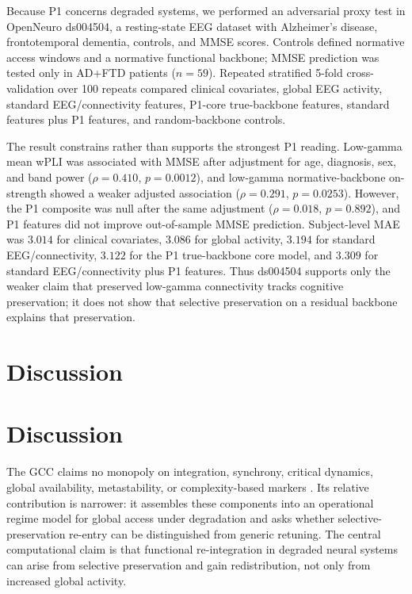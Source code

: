 \documentclass[11pt,a4paper]{article}
\theoremstyle{plain}
\theoremstyle{definition}
\theoremstyle{remark}
\begin{document}
Because P1 concerns degraded systems, we performed an adversarial proxy test in OpenNeuro ds004504, a resting-state EEG dataset with Alzheimer's disease, frontotemporal dementia, controls, and MMSE scores. Controls defined normative access windows and a normative functional backbone; MMSE prediction was tested only in AD+FTD patients ($n=59$). Repeated stratified 5-fold cross-validation over 100 repeats compared clinical covariates, global EEG activity, standard EEG/connectivity features, P1-core true-backbone features, standard features plus P1 features, and random-backbone controls.

The result constrains rather than supports the strongest P1 reading. Low-gamma mean wPLI was associated with MMSE after adjustment for age, diagnosis, sex, and band power ($\rho = 0.410$, $p = 0.0012$), and low-gamma normative-backbone on-strength showed a weaker adjusted association ($\rho = 0.291$, $p = 0.0253$). However, the P1 composite was null after the same adjustment ($\rho = 0.018$, $p = 0.892$), and P1 features did not improve out-of-sample MMSE prediction. Subject-level MAE was $3.014$ for clinical covariates, $3.086$ for global activity, $3.194$ for standard EEG/connectivity, $3.122$ for the P1 true-backbone core model, and $3.309$ for standard EEG/connectivity plus P1 features. Thus ds004504 supports only the weaker claim that preserved low-gamma connectivity tracks cognitive preservation; it does not show that selective preservation on a residual backbone explains that preservation.


\section*{Discussion}

\section{Discussion}
\label{sec:diskussion}

The GCC claims no monopoly on integration, synchrony, critical dynamics, global availability, metastability, or complexity-based markers \citep{dehaene1998,tononi2004,fries2015,kelso2012,deco2017,casali2013,demertzi2019,carhartharris2014,schartner2015,luppi2019}. Its relative contribution is narrower: it assembles these components into an operational regime model for global access under degradation and asks whether selective-preservation re-entry can be distinguished from generic retuning. The central computational claim is that functional re-integration in degraded neural systems can arise from selective preservation and gain redistribution, not only from increased global activity.
\end{document}
